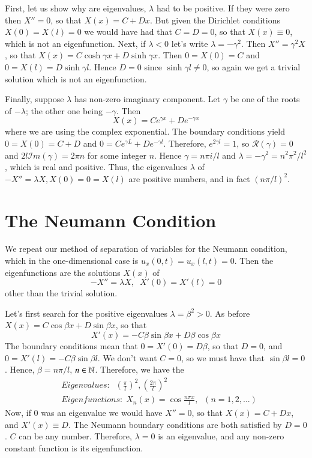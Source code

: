 \documentclass[12pt, a4paper, oneside, openright, titlepage]{book}
\begin{document}
First, let us show why are eigenvalues, $\lambda$ had to be positive. If they were zero then $X'' = 0$, so that $X(x) = C+Dx$. But given the Dirichlet conditions $X(0) = X(l) = 0$ we would have had that $C = D = 0$, so that $X(x) \equiv 0$, which is not an eigenfunction. Next, if $\lambda < 0$ let's write $\lambda = -\gamma^2$. Then $X''=\gamma^2X$, so that $X(x) = C\cosh\gamma x + D\sinh\gamma x$. Then $0 = X(0) = C$ and $0 = X(l) = D\sinh\gamma l$. Hence $D = 0$ since $\sinh\gamma l \neq 0$, so again we get a trivial solution which is not an eigenfunction.

Finally, suppose $\lambda$ has non-zero imaginary component. Let $\gamma$ be one of the roots of $-\lambda$; the other one being $-\gamma$. Then \begin{equation*}
    X(x) = Ce^{\gamma x} + De^{-\gamma x}
\end{equation*}
where we are using the complex exponential. The boundary conditions yield $0 = X(0) = C+D$ and $0 = Ce^{\gamma L} + De^{-\gamma l}$. Therefore, $e^{2\gamma l} = 1$, so $\mathscr{R}(\gamma) = 0$ and $2l\mathscr{I}m(\gamma) = 2\pi n$ for some integer $n$. Hence $\gamma = n\pi i /l$ and $\lambda = -\gamma^2 = n^2\pi^2/l^2$, which is real and positive. Thus, the eigenvalues $\lambda$ of $-X'' = \lambda X, X(0) = 0 = X(l)$ are positive numbers, and in fact $(n\pi/l)^2$.



\section{The Neumann Condition}

We repeat our method of separation of variables for the Neumann condition, which in the one-dimensional case is $u_x(0,t) = u_x(l,t)=0$. Then the eigenfunctions are the solutions $X(x)$ of \begin{equation}
    -X''=\lambda X,\;\;X'(0) = X'(l) = 0
\end{equation}
other than the trivial solution. 

Let's first search for the positive eigenvalues $\lambda = \beta^2 > 0$. As before $X(x) = C\cos\beta x + D\sin \beta x$, so that \begin{equation*}
    X'(x) = -C\beta\sin\beta x+ D\beta \cos\beta x
\end{equation*}
The boundary conditions mean that $0 = X'(0) = D\beta$, so that $D=0$, and $0 = X'(l) = -C\beta \sin\beta l$. We don't want $C = 0$, so we must have that $\sin \beta l = 0$. Hence, $\beta = n\pi/l$, $n \in \mathbb N$. Therefore, we have the \begin{align}
    &Eigenvalues:\;\;\left(\frac{\pi}{l}\right)^2,\left(\frac{2\pi}{l}\right)^2 \\
    &Eigenfunctions: \;X_n(x) = \cos\frac{n\pi x}{l},\;\;(n=1,2,...)
\end{align}
Now, if $0$ was an eigenvalue we would have $X'' = 0$, so that $X(x) = C+Dx$, and $X'(x) \equiv D$. The Neumann boundary conditions are both satisfied by $D = 0$. $C$ can be any number. Therefore, $\lambda = 0$ is an eigenvalue, and any non-zero constant function is its eigenfunction.
\end{document}
